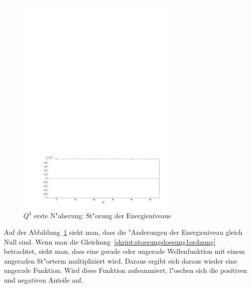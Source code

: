 \begin{refsection}
\begin{figure}	%
\centering
\includegraphics[width=0.7\textwidth]{anharmonisch/images/x3/EK1.pdf}
\caption{$Q^3$ erste N"aherung: St"orung der Energieniveaus  
\label{skript:x3_EK1}}
\end{figure}

Auf der Abbildung~\ref{skript:x3_EK1} sieht man, dass die "Anderungen
der Energieniveau gleich Null sind.
Wenn man die Gleichung~\ref{skript:stoerungsloesung1ordnung} betrachtet,
sieht man, dass eine gerade oder ungerade Wellenfunktion mit einem ungeraden
St"orterm multipliziert wird.
Daraus ergibt sich daraus wieder eine ungerade Funktion.
Wird diese Funktion aufsummiert,
l"oschen sich die positiven und negativen Anteile auf.


\end{refsection}
